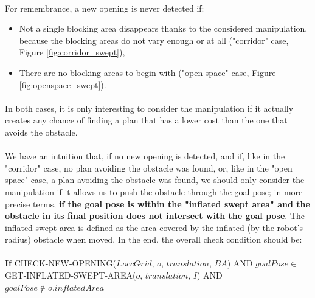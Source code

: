 \paragraph{} For remembrance, a new opening is never detected if:

\begin{itemize}
  \item Not a single blocking area disappears thanks to the considered manipulation, because the blocking areas do not vary enough or at all ("corridor" case, Figure \ref{fig:corridor_swept}),
  \item There are no blocking areas to begin with ("open space" case, Figure \ref{fig:openspace_swept}).
\end{itemize}

\paragraph{} In both cases, it is only interesting to consider the manipulation if it actually creates any chance of finding a plan that has a lower cost than the one that avoids the obstacle.

\paragraph{} We have an intuition that, if no new opening is detected, and if, like in the "corridor" case, no plan avoiding the obstacle was found, or, like in the "open space" case, a plan avoiding the obstacle was found, we should only consider the manipulation if it allows us to push the obstacle through the goal pose; in more precise terms, \textbf{if the goal pose is within the "inflated swept area" and the obstacle in its final position does not intersect with the goal pose}. The inflated swept area is defined as the area covered by the inflated (by the robot's radius) obstacle when moved. In the end, the overall check condition should be:

\paragraph{} \textbf{If} CHECK-NEW-OPENING($I.occGrid$, $o$, $translation$, $BA$) AND $goalPose \in$ GET-INFLATED-SWEPT-AREA($o$, $translation$, $I$) AND $goalPose \not\in o.inflatedArea$

